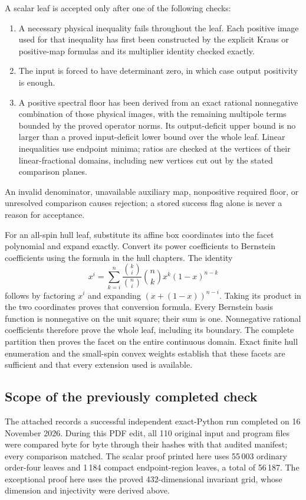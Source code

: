 \documentclass[11pt,a4paper]{article}
\begin{document}
A scalar leaf is accepted only after one of the following checks:
\begin{enumerate}
\item A necessary physical inequality fails throughout the leaf. Each
positive image used for that inequality has first been constructed by
the explicit Kraus or positive-map formulas and its multiplier identity
checked exactly.
\item The input is forced to have determinant zero, in which case output
positivity is enough.
\item A positive spectral floor has been derived from an exact rational
nonnegative combination of those physical images, with the remaining
multipole terms bounded by the proved operator norms. Its output-deficit
upper bound is no larger than a proved input-deficit lower bound over
the whole leaf. Linear inequalities use endpoint minima; ratios are
checked at the vertices of their linear-fractional domains, including
new vertices cut out by the stated comparison planes.
\end{enumerate}
An invalid denominator, unavailable auxiliary map, nonpositive required
floor, or unresolved comparison causes rejection; a stored success flag
alone is never a reason for acceptance.

For an all-spin hull leaf, substitute its affine box coordinates into
the facet polynomial and expand exactly. Convert its power coefficients
to Bernstein coefficients using the formula in the hull chapters.
The identity
\[
 x^i=\sum_{k=i}^n\frac{\binom ki}{\binom ni}
 \binom nk x^k(1-x)^{n-k}
\]
follows by factoring $x^i$ and expanding $(x+(1-x))^{n-i}$.
Taking its product in the two coordinates proves that conversion
formula. Every Bernstein basis function is nonnegative on the unit
square; their sum is one. Nonnegative rational coefficients therefore
prove the whole leaf, including its boundary. The complete partition
then proves the facet on the entire continuous domain. Exact finite
hull enumeration and the small-spin convex weights establish that
these facets are sufficient and that every extension used is available.

\subsection{Scope of the previously completed check}
The attached  records a successful independent
exact-Python run completed on 16 November 2026. During this PDF edit,
all 110 original input and program files were compared byte for byte
through their hashes with that audited manifest; every comparison matched.
The scalar proof printed here uses 55\,003 ordinary order-four leaves
and 1\,184 compact endpoint-region leaves, a total of 56\,187. The exceptional proof here uses the proved 432-dimensional invariant
grid, whose dimension and injectivity were derived above.
\end{document}
